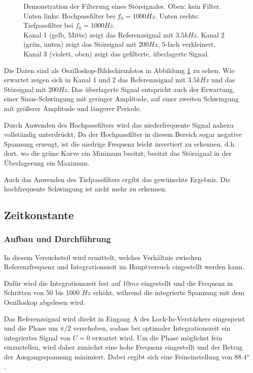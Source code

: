 \documentclass{../Misc/MontavonLaTeX/Montavon}
\begin{document}
\begin{figure}[htbp]
\caption{Demonstration der Filterung eines Störsignales. Oben: kein Filter. Unten links: Hochpassfilter bei $f_0 = 1000 \unit{Hz}$. Unten rechts: Tiefpassfilter bei $f_0 = 1000 \unit{Hz}$. \\Kanal 1 (gelb, Mitte) zeigt das Referenzsignal mit $3.5 \unit{kHz}$. Kanal 2 (grün, unten) zeigt das Störsignal mit $200 \unit{Hz}$, 5-fach verkleinert. Kanal 3 (violett, oben) zeigt das gefilterte, überlagerte Signal.}
\label{fig:filtering}
\end{figure}

Die Daten sind als Oszilloskop-Bildschirmfotos in Abbildung \ref{fig:filtering} zu sehen. Wie erwartet zeigen sich in Kanal 1 und 2 das Referenzsignal mit $3.5 \unit{kHz}$ und das Störsignal mit $200 \unit{Hz}$. Das überlagerte Signal entspricht auch der Erwartung, einer Sinus-Schwingung mit geringer Amplitude, auf einer zweiten Schwingung mit größerer Amplitude und längerer Periode.

Durch Anwenden des Hochpassfilters wird das niederfrequente Signal nahezu vollständig unterdrückt. Da der Hochpassfilter in diesem Bereich sogar negative Spannung erzeugt, ist die niedrige Frequenz leicht invertiert zu erkennen, d.h. dort, wo die grüne Kurve ein Minimum besitzt, besitzt das Störsignal in der Überlagerung ein Maximum.

Auch das Anwenden des Tiefpassfilters ergibt das gewünschte Ergebnis. Die hochfrequente Schwingung ist nicht mehr zu erkennen.

\subsection{Zeitkonstante}
\subsubsection{Aufbau und Durchführung}
In diesem Versuchsteil wird ermittelt, welches Verhältnis zwischen Referenzfrequenz und Integrationszeit im Hauptversuch eingestellt werden kann. 

Dafür wird die Integrationszeit fest auf $10 \unit{ms}$ eingestellt und die Frequenz in Schritten von 50 bis 1000 $\unit{Hz}$ erhöht, während die integrierte Spannung mit dem Oszilloskop abgelesen wird.

Das Referenzsignal wird direkt in Eingang A des Lock-In-Verstärkers eingespeist und die Phase um $\pi / 2$ verschoben, sodass bei optimaler Integrationszeit ein integriertes Signal von $U = 0$ erwartet wird. 
Um die Phase möglichst fein einzustellen, wird daher zunächst eine hohe Frequenz eingestellt und der Betrag der Ausgangsspannung minimiert. Dabei ergibt sich eine Feineinstellung von $88.4 \unit{\degree}$.
\end{document}
